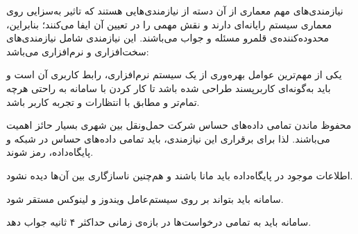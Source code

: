 
نیازمندی‌های مهم معماری از آن دسته از نیازمندی‌هایی هستند که تاثیر به‌سزایی روی معماری سیستم رایانه‌ای دارند و نقش مهمی را در تعیین آن ایفا می‌کنند؛ بنابراین، محدوده‌کننده‌ی قلمرو مسئله و جواب می‌باشند. این نیازمندی شامل نیازمندی‌های سخت‌افزاری و نرم‌افزاری می‌باشد:

  یکی از مهم‌ترین عوامل بهره‌وری از یک سیستم نرم‌افزاری، رابط کاربری آن است و باید به‌گونه‌ای کاربرپسند طراحی شده باشد تا کار کردن با سامانه به راحتی هرچه تمام‌تر و مطابق با انتظارات و تجربه کاربر باشد.

  محفوظ ماندن تمامی داده‌های حساس شرکت حمل‌ونقل بین شهری بسیار حائز اهمیت می‌باشند. لذا برای برقراری این نیازمندی، باید تمامی داده‌های حساس در شبکه و پایگاه‌داده، رمز شوند.

  اطلاعات موجود در پایگاه‌داده باید مانا باشند و هم‌چنین ناسازگاری بین آن‌ها دیده نشود.

  سامانه باید بتواند بر روی سیستم‌عامل ویندوز و لینوکس مستقر شود.

  سامانه باید به تمامی درخواست‌ها در بازه‌ی زمانی حداکثر ۴ ثانیه جواب دهد.
